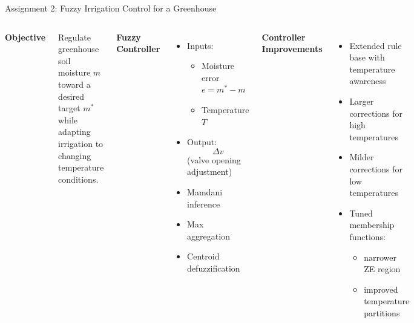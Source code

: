 \documentclass[10pt]{beamer}
\begin{document}
\begin{frame}{Assignment 2: Fuzzy Irrigation Control for a Greenhouse}

\begin{columns}[T]


\textbf{Objective}

Regulate greenhouse soil moisture $m$ toward a desired target $m^*$ while
adapting irrigation to changing temperature conditions.

\vspace{0.2cm}

\textbf{Fuzzy Controller}

\begin{itemize}
    \item Inputs:
    \begin{itemize}
        \item Moisture error $e = m^* - m$
        \item Temperature $T$
    \end{itemize}

    \item Output:
    \[
    \Delta v
    \]
    (valve opening adjustment)

    \item Mamdani inference
    \item Max aggregation
    \item Centroid defuzzification
\end{itemize}

\vspace{0.2cm}

\textbf{Controller Improvements}

\begin{itemize}
    \item Extended rule base with temperature awareness
    \item Larger corrections for high temperatures
    \item Milder corrections for low temperatures
    \item Tuned membership functions:
    \begin{itemize}
        \item narrower ZE region
        \item improved temperature partitions
    \end{itemize}
\end{itemize}


\end{columns}
\end{frame}
\end{document}
